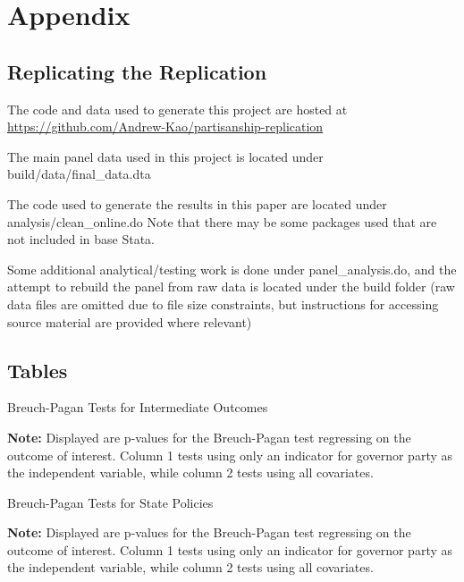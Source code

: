 \documentclass{article}
\begin{document}
\section{Appendix}

\subsection{Replicating the Replication}

The code and data used to generate this project are hosted at \url{https://github.com/Andrew-Kao/partisanship-replication}

The main panel data used in this project is located under build/data/final\_data.dta

The code used to generate the results in this paper are located under analysis/clean\_online.do    Note that there may be some packages used that are not included in base Stata. 

Some additional analytical/testing work is done under panel\_analysis.do, and the attempt to rebuild the panel from raw data is located under the build folder (raw data files are omitted due to file size constraints, but instructions for accessing source material are provided where relevant)

\subsection{Tables}


\begin{table}[!hbtp]
\caption{Breuch-Pagan Tests for Intermediate Outcomes}

\textbf{Note:} Displayed are p-values for the Breuch-Pagan test regressing on the outcome of interest. Column 1 tests using only an indicator for governor party as the independent variable, while column 2 tests using all covariates. 
\label{table:bp_outcome}
\end{table}

\begin{table}[!hbtp]
\caption{Breuch-Pagan Tests for State Policies}

\textbf{Note:} Displayed are p-values for the Breuch-Pagan test regressing on the outcome of interest. Column 1 tests using only an indicator for governor party as the independent variable, while column 2 tests using all covariates. 
\label{table:bp_policies}
\end{table}
\end{document}
